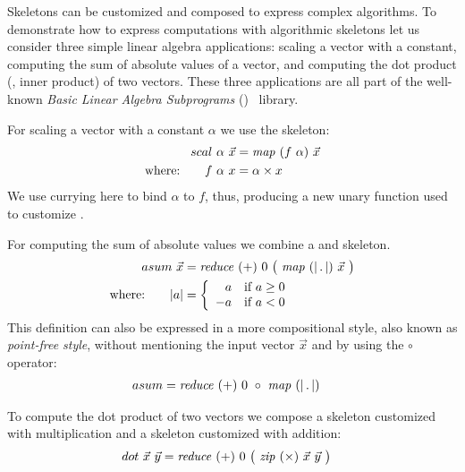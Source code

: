 Skeletons can be customized and composed to express complex algorithms.
To demonstrate how to express computations with algorithmic skeletons let us consider three simple linear algebra applications:
scaling a vector with a constant, computing the sum of absolute values of a vector, and computing the dot product (\aka, inner product) of two vectors.
These three applications are all part of the well-known \emph{Basic Linear Algebra Subprograms}  (\BLAS)~\cite{Dongarra2002,Dongarra2002a} library.

For scaling a vector with a constant $\alpha$ we use the \map skeleton:
\begin{align*}
  scal\ \alpha\ \vec{x}&= \text{\textit{map}}\ (f\ \alpha)\ \vec{x}\\
  \text{where:} \qquad f\ \alpha\ x &= \alpha \times x
\end{align*}
We use currying here to bind $\alpha$ to $f$, thus, producing a new unary function used to customize \map.

For computing the sum of absolute values we combine a \map and \reduce skeleton.
\begin{align*}
  asum\ \vec{x} &= \text{\textit{reduce}}\ (+)\ 0\ \big(\ \text{\textit{map}}\ (|\, .\, |)\ \vec{x}\ \big)\\
  \text{where:} \qquad | a | &=
    \left\{
      \begin{array}{r l}
      a & \text{if } a \geq 0\\
      -a & \text{if } a < 0
      \end{array}
    \right.
\end{align*}
This definition can also be expressed in a more compositional style, also known as \emph{point-free style}, without mentioning the input vector $\vec{x}$ and by using the $\circ$ operator:
\begin{align*}
  asum &= \text{\textit{reduce}}\ (+)\ 0\ \circ\ \text{\textit{map}}\ (|\, .\, |)
\end{align*}

To compute the dot product of two vectors we compose a \zip skeleton customized with multiplication and a \reduce skeleton customized with addition:
\begin{align*}
  dot\ \vec{x}\ \vec{y} &= \text{\textit{reduce}}\ (+)\ 0\ \big(\ \text{\textit{zip}}\ (\times)\ \vec{x}\ \vec{y}\ \big)
\end{align*}

